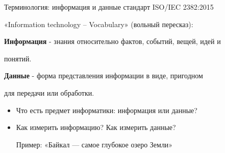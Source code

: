 \begin{frame}{Терминология: информация и данные}
\parindent=15mm
\color{black}
 стандарт ISO/IEC 2382:2015

\noindent«Information technology – Vocabulary» (вольный пересказ):

\color[rgb]{0,0.7,0.4}\textbf{Информация}
\color{black}
- знания относительно фактов, событий, вещей, идей и

понятий.


\color[rgb]{0,0.7,0.4}\textbf{Данные}
\color{black}
- форма представления информации в виде, пригодном

для передачи или обработки.
\vskip 2.5mm

\begin{itemize}
	\item[\textbullet] Что есть предмет информатики: информация или данные?
	\item[\textbullet] Как измерить информацию? Как измерить данные? 
	
	Пример: «Байкал — самое глубокое озеро Земли»
\end{itemize}
\end{frame}